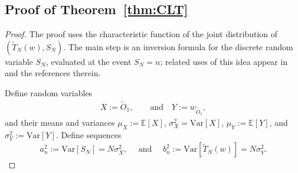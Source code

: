 \documentclass[11pt]{article}
\numberwithin{equation}{section}
\newcommand{\Var}[1]{\mathrm{Var}\left[ #1\right]}
\newcommand{\ex}[1]{\ensuremath{\mathbb{E}\left[ #1\right]}}
\begin{document}
\subsection{Proof of Theorem~\ref{thm:CLT}}
\label{sec:proof_CLT}
\begin{proof}
The proof uses the characteristic function of the joint distribution of $(\tilde{T}_N(w), S_N)$. The main step is an inversion formula for the discrete random variable $S_N$, evaluated at the event $S_N=n$; related uses of this idea appear in \cite{holst1981conditional,janson2001moment,klein2019conditional} and the references therein. 

Define random variables
    \begin{align}
        \label{eq:XY_definitions}
    X := \tilde{O}_1,\qquad \text{and} \quad Y := w_{\tilde{O}_1}, 
\end{align}
and their means and variances $\mu_X := \ex{X}$, $\sigma_X^2=\Var{X}$, $\mu_Y := \ex{Y}$, and $\sigma_Y^2:=\Var{Y}$. Define sequences
\begin{align}
    a_n^2 := \Var{S_N} = N\sigma_X^2,\quad \text{ and } \quad b_n^2 := \Var{\tilde T_N(w)} = N\sigma_Y^2.
    \label{eq:sum_variance_sequences}
\end{align}


\end{proof}
\end{document}
